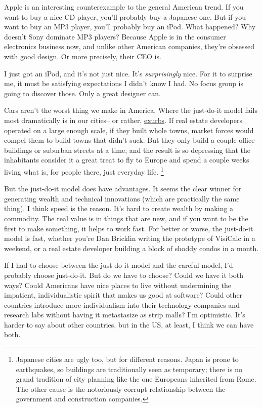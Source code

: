 \documentclass[12pt]{book}
\begin{document}
Apple is an interesting counterexample to the general American trend. If
you want to buy a nice CD player, you'll probably buy a Japanese one.
But if you want to buy an MP3 player, you'll probably buy an iPod. What
happened? Why doesn't Sony dominate MP3 players? Because Apple is in the
consumer electronics business now, and unlike other American companies,
they're obsessed with good design. Or more precisely, their CEO is.

I just got an iPod, and it's not just nice. It's \emph{surprisingly}
nice. For it to surprise me, it must be satisfying expectations I didn't
know I had. No focus group is going to discover those. Only a great
designer can.

Cars aren't the worst thing we make in America. Where the just-do-it
model fails most dramatically is in our cities-- or rather,
\href{denver.html}{exurbs}. If real estate developers operated on a
large enough scale, if they built whole towns, market forces would
compel them to build towns that didn't suck. But they only build a
couple office buildings or suburban streets at a time, and the result is
so depressing that the inhabitants consider it a great treat to fly to
Europe and spend a couple weeks living what is, for people there, just
everyday life. \footnote{Japanese cities are ugly too, but for different reasons. Japan
is prone to earthquakes, so buildings are traditionally seen as
temporary; there is no grand tradition of city planning like the one
Europeans inherited from Rome. The other cause is the notoriously
corrupt relationship between the government and construction companies.}

But the just-do-it model does have advantages. It seems the clear winner
for generating wealth and technical innovations (which are practically
the same thing). I think speed is the reason. It's hard to create wealth
by making a commodity. The real value is in things that are new, and if
you want to be the first to make something, it helps to work fast. For
better or worse, the just-do-it model is fast, whether you're Dan
Bricklin writing the prototype of VisiCalc in a weekend, or a real
estate developer building a block of shoddy condos in a month.

If I had to choose between the just-do-it model and the careful model,
I'd probably choose just-do-it. But do we have to choose? Could we have
it both ways? Could Americans have nice places to live without
undermining the impatient, individualistic spirit that makes us good at
software? Could other countries introduce more individualism into their
technology companies and research labs without having it metastasize as
strip malls? I'm optimistic. It's harder to say about other countries,
but in the US, at least, I think we can have both.
\end{document}
